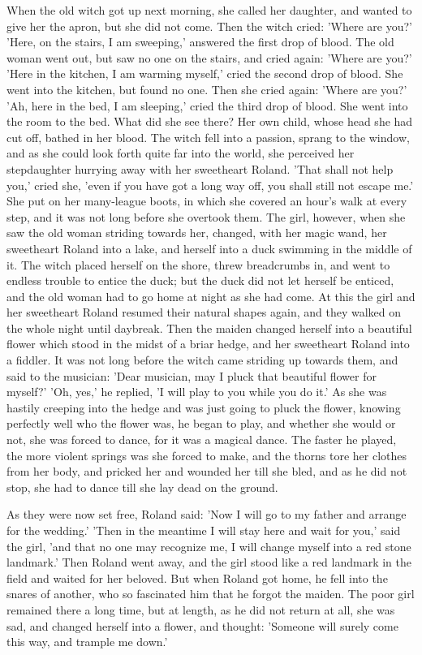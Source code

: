 \documentclass[12pt]{book}
\begin{document}
When the old witch got up next morning, she called her daughter, and
wanted to give her the apron, but she did not come. Then the witch
cried: 'Where are you?' 'Here, on the stairs, I am sweeping,' answered
the first drop of blood. The old woman went out, but saw no one on the
stairs, and cried again: 'Where are you?' 'Here in the kitchen, I am
warming myself,' cried the second drop of blood. She went into the
kitchen, but found no one. Then she cried again: 'Where are you?' 'Ah,
here in the bed, I am sleeping,' cried the third drop of blood. She
went into the room to the bed. What did she see there? Her own child,
whose head she had cut off, bathed in her blood. The witch fell into a
passion, sprang to the window, and as she could look forth quite far
into the world, she perceived her stepdaughter hurrying away with her
sweetheart Roland. 'That shall not help you,' cried she, 'even if you
have got a long way off, you shall still not escape me.' She put on
her many-league boots, in which she covered an hour's walk at every
step, and it was not long before she overtook them. The girl, however,
when she saw the old woman striding towards her, changed, with her
magic wand, her sweetheart Roland into a lake, and herself into a duck
swimming in the middle of it. The witch placed herself on the shore,
threw breadcrumbs in, and went to endless trouble to entice the duck;
but the duck did not let herself be enticed, and the old woman had to
go home at night as she had come. At this the girl and her sweetheart
Roland resumed their natural shapes again, and they walked on the
whole night until daybreak. Then the maiden changed herself into a
beautiful flower which stood in the midst of a briar hedge, and her
sweetheart Roland into a fiddler. It was not long before the witch
came striding up towards them, and said to the musician: 'Dear
musician, may I pluck that beautiful flower for myself?' 'Oh, yes,' he
replied, 'I will play to you while you do it.' As she was hastily
creeping into the hedge and was just going to pluck the flower,
knowing perfectly well who the flower was, he began to play, and
whether she would or not, she was forced to dance, for it was a
magical dance. The faster he played, the more violent springs was she
forced to make, and the thorns tore her clothes from her body, and
pricked her and wounded her till she bled, and as he did not stop, she
had to dance till she lay dead on the ground.

As they were now set free, Roland said: 'Now I will go to my father
and arrange for the wedding.' 'Then in the meantime I will stay here
and wait for you,' said the girl, 'and that no one may recognize me, I
will change myself into a red stone landmark.' Then Roland went away,
and the girl stood like a red landmark in the field and waited for her
beloved. But when Roland got home, he fell into the snares of another,
who so fascinated him that he forgot the maiden. The poor girl
remained there a long time, but at length, as he did not return at
all, she was sad, and changed herself into a flower, and thought:
'Someone will surely come this way, and trample me down.'
\end{document}

